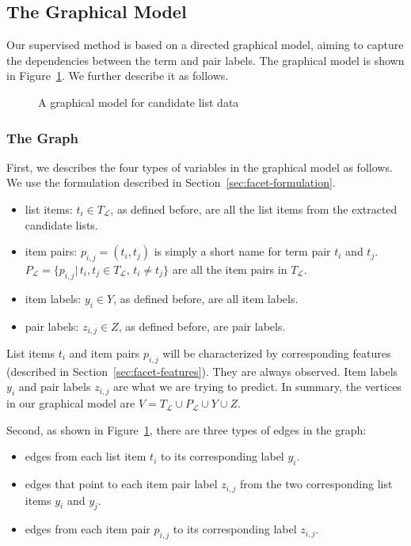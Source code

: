 \subsection{The Graphical Model}
\label{sec:facet-model}
Our supervised method is based on a directed graphical model, aiming to capture the dependencies between the term and pair labels. The graphical model is shown in Figure~\ref{fig:gm}. We further describe it as follows.

\begin{figure}[!ht]
\centering
{}
\caption{A graphical model for candidate list data}
\label{fig:gm}
\end{figure}

\subsubsection{The Graph}
First, we describes the four types of variables in the graphical model as follows. We use the formulation described in Section~\ref{sec:facet-formulation}.
\begin{itemize}
 \item list items: $t_i \in T_\mathcal{L}$, as defined before, are all the list items from the extracted candidate lists.
 \item item pairs: $p_{i,j}=(t_i,t_j)$ is simply a short name for term pair $t_i$ and $t_j$. $P_{\mathcal{L}}=\{p_{i,j}|\, t_i,t_j\!\in\!T_{\mathcal{L}}, \, t_i \!\neq\! t_j \}$ are all the item pairs in $T_\mathcal{L}$.
 \item item labels: $y_i \in Y$, as defined before, are all item labels.
  \item pair labels: $z_{i,j} \in Z$, as defined before, are pair labels.
\end{itemize}
List items $t_i$ and item pairs $p_{i,j}$ will be characterized by corresponding features (described in Section~\ref{sec:facet-features}). They are always observed. Item labels $y_i$ and pair labels $z_{i,j}$ are what we are trying to predict. In summary, the vertices in our graphical model are $V=T_{\mathcal{L}} \cup P_{\mathcal{L}} \cup Y \cup Z$.

Second, as shown in Figure~\ref{fig:gm}, there are three types of edges in the graph:
\begin{itemize}
 \item edges from each list item $t_i$ to its corresponding label $y_i$. 
 \item edges that point to each item pair label $z_{i,j}$ from the two corresponding list items $y_i$ and $y_j$.
 \item edges from each item pair $p_{i,j}$ to its corresponding label $z_{i,j}$.
\end{itemize}

